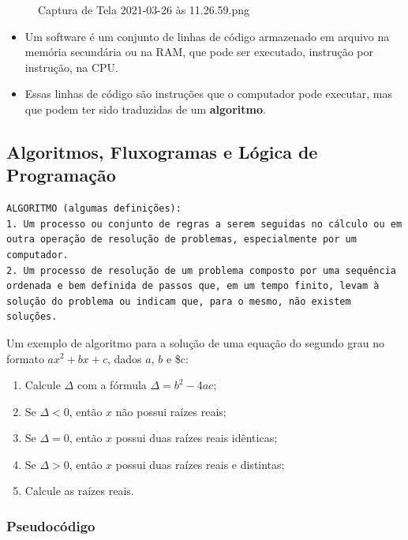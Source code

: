 \documentclass[12pt,a4paper]{article}
\providecommand{\tightlist}{%
      \setlength{\itemsep}{0pt}\setlength{\parskip}{0pt}}
\begin{document}
    \begin{figure}
\centering
\caption{Captura de Tela 2021-03-26 às 11.26.59.png}
\end{figure}

    \begin{itemize}
\item
  Um software é um conjunto de linhas de código armazenado em arquivo na
  memória secundária ou na RAM, que pode ser executado, instrução por
  instrução, na CPU.
\item
  Essas linhas de código são instruções que o computador pode executar,
  mas que podem ter sido traduzidas de um \textbf{algoritmo}.
\end{itemize}

    \hypertarget{algoritmos-fluxogramas-e-luxf3gica-de-programauxe7uxe3o}{%
\subsection{Algoritmos, Fluxogramas e Lógica de
Programação}\label{algoritmos-fluxogramas-e-luxf3gica-de-programauxe7uxe3o}}

    \begin{verbatim}
ALGORITMO (algumas definições):
1. Um processo ou conjunto de regras a serem seguidas no cálculo ou em outra operação de resolução de problemas, especialmente por um computador.
2. Um processo de resolução de um problema composto por uma sequência ordenada e bem definida de passos que, em um tempo finito, levam à solução do problema ou indicam que, para o mesmo, não existem soluções.
\end{verbatim}

    Um exemplo de algoritmo para a solução de uma equação do segundo grau no
formato \(ax^2 + bx + c\), dados \(a\), \(b\) e \$c:

\begin{enumerate}
\def\labelenumi{\arabic{enumi}.}
\tightlist
\item
  Calcule \(\Delta\) com a fórmula \(\Delta = b^2 - 4ac\);
\item
  Se \(\Delta < 0\), então \(x\) não possui raízes reais;
\item
  Se \(\Delta = 0\), então \(x\) possui duas raízes reais idênticas;
\item
  Se \(\Delta > 0\), então \(x\) possui duas raízes reais e distintas;
\item
  Calcule as raízes reais.
\end{enumerate}

    \hypertarget{pseudocuxf3digo}{%
\subsubsection{Pseudocódigo}\label{pseudocuxf3digo}}
\end{document}
